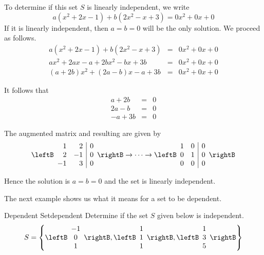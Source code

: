 \begin{solution}
To determine if this set $S$ is linearly independent, we write
\[
a ( x^2 + 2x -1 ) + b(2x^2 - x + 3) = 0x^2 + 0x + 0
\]
If it is linearly independent, then $a=b=0$ will be the only solution. We proceed as follows. 
\begin{eqnarray*}
a ( x^2 + 2x -1 ) + b(2x^2 - x + 3) &=& 0x^2 + 0x + 0 \\
ax^2 + 2ax - a + 2bx^2 - bx + 3b &=& 0x^2 + 0x + 0 \\
(a+2b)x^2 + (2a -b)x  - a + 3b &=&  0x^2 + 0x + 0
\end{eqnarray*}

It follows that
\begin{eqnarray*}
a + 2b &=& 0 \\
2a - b &=& 0 \\
-a + 3b &=& 0
\end{eqnarray*}

The augmented matrix and resulting {\rref} are given by
\[
\leftB \begin{array}{rr|r}
1 & 2 & 0 \\
2 & -1 & 0 \\
-1 & 3 & 0 
\end{array} \rightB 
\rightarrow \cdots \rightarrow
\leftB \begin{array}{rr|r}
1 & 0 & 0 \\
0 & 1 & 0 \\
0 & 0 & 0 
\end{array} \rightB 
\]

Hence the solution is $a=b=0$ and the set is linearly independent. 
\end{solution}

The next example shows us what it means for a set to be dependent.

\begin{example}{Dependent Set}{dependent}
Determine if the set $S$ given below is independent. 
\[
S=\left\{
\leftB\begin{array}{c} -1 \\ 0 \\ 1 \end{array}\rightB,
\leftB\begin{array}{c} 1 \\ 1 \\ 1 \end{array}\rightB,
\leftB\begin{array}{c} 1 \\ 3 \\ 5 \end{array}\rightB \right\}
\]
\end{example}

